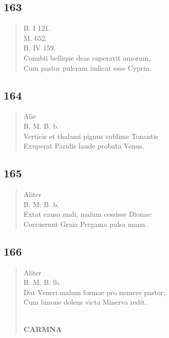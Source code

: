 \documentclass[11pt, a4paper]{report}
\begin{document}
            \subsection*{163}
      \begin{verse}
      B. I 121. \\ M. 652. \\ B. IV 159. \\ Conubii bellique deas superavit amorum, \\ Cum pastor pulcram iudicat esse Cyprin. \\ 
      \end{verse}
  
            \subsection*{164}
      \begin{verse}
       \lbrack Alie \rbrack  \\ B. M. B. b. \\ Verticis et thalami pignus sublime Tonantis \\ Exuperat Paridis laude probata Venus. \\ 
      \end{verse}
  
            \subsection*{165}
      \begin{verse}
       \lbrack Aliter \rbrack  \\ B. M. B. b. \\ Extat causa mali, malum cessisse Dionae: \\ Corruerunt Graia Pergama pulsa manu. \\ 
      \end{verse}
  
            \subsection*{166}
      \begin{verse}
       \lbrack Aliter \rbrack  \\ B. M. B. lb. \\ Dat Veneri malum formae pro munere pastor; \\ Cum lunone dolens victa Minerva redit. \\ 
        ﻿\pagebreak 
     \marginpar{[150]} \begin{center} \textbf{CARMNA} \end{center}
      \end{verse}
  
\end{document}
